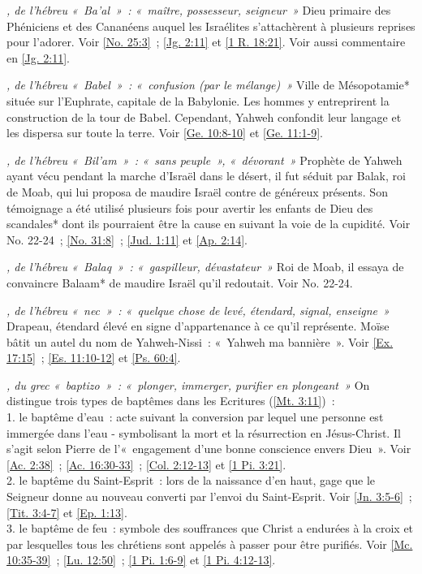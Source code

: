 \begin{multicols}{2}
\textit{, de l'hébreu «~Ba'al~»~: «~maître, possesseur, seigneur~»}\newline
Dieu primaire des Phéniciens et des Cananéens auquel les Israélites s'attachèrent à plusieurs reprises pour l'adorer. Voir \vref{No. 25:3}~; \vref{Jg. 2:11} et \vref{1 R. 18:21}. Voir aussi commentaire en \vref{Jg. 2:11}.

\textit{, de l'hébreu «~Babel~»~: «~confusion (par le mélange)~»}\newline
Ville de Mésopotamie* située sur l'Euphrate, capitale de la Babylonie. Les hommes y entreprirent la construction de la tour de Babel. Cependant, Yahweh confondit leur langage et les dispersa sur toute la terre. Voir \vref{Ge. 10:8-10} et \vref{Ge. 11:1-9}.

\textit{, de l'hébreu «~Bil'am~»~: «~sans peuple~», «~dévorant~»}\newline
Prophète de Yahweh ayant vécu pendant la marche d'Israël dans le désert, il fut séduit par Balak, roi de Moab, qui lui proposa de maudire Israël contre de généreux présents. Son témoignage a été utilisé plusieurs fois pour avertir les enfants de Dieu des scandales* dont ils pourraient être la cause en suivant la voie de la cupidité. Voir No. 22-24~; \vref{No. 31:8}~; \vref{Jud. 1:11} et \vref{Ap. 2:14}.

\textit{, de l'hébreu «~Balaq~»~: «~gaspilleur, dévastateur~»}\newline
Roi de Moab, il essaya de convaincre Balaam* de maudire Israël qu'il redoutait. Voir No. 22-24.

\textit{, de l'hébreu «~nec~»~: «~quelque chose de levé, étendard, signal, enseigne~»}\newline
Drapeau, étendard élevé en signe d'appartenance à ce qu'il représente. Moïse bâtit un autel du nom de Yahweh-Nissi~: «~Yahweh ma bannière~». Voir \vref{Ex. 17:15}~; \vref{Es. 11:10-12} et \vref{Ps. 60:4}.

\textit{, du grec «~baptizo~»~: «~plonger, immerger, purifier en plongeant~»}\newline
On distingue trois types de baptêmes dans les Ecritures (\vref{Mt. 3:11})~:
\\1. le baptême d'eau~: acte suivant la conversion par lequel une personne est immergée dans l'eau - symbolisant la mort et la résurrection en Jésus-Christ. Il s'agit selon Pierre de l'«~engagement d'une bonne conscience envers Dieu~». Voir \vref{Ac. 2:38}~; \vref{Ac. 16:30-33}~; \vref{Col. 2:12-13} et \vref{1 Pi. 3:21}.
\\2. le baptême du Saint-Esprit~: lors de la naissance d'en haut, gage que le Seigneur donne au nouveau converti par l'envoi du Saint-Esprit. Voir \vref{Jn. 3:5-6}~; \vref{Tit. 3:4-7} et \vref{Ep. 1:13}.
\\3. le baptême de feu~: symbole des souffrances que Christ a endurées à la croix et par lesquelles tous les chrétiens sont appelés à passer pour être purifiés. Voir \vref{Mc. 10:35-39}~; \vref{Lu. 12:50}~; \vref{1 Pi. 1:6-9} et \vref{1 Pi. 4:12-13}.


\end{multicols}
